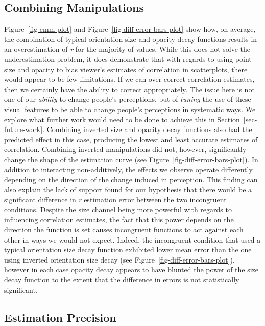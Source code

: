 \documentclass[manuscript, review, anonymous, screen]{acmart}
\begin{document}
\hypertarget{sec-combining}{%
\subsection{Combining Manipulations}\label{sec-combining}}

Figure~\ref{fig-emm-plot} and Figure~\ref{fig-diff-error-bars-plot} show
how, on average, the combination of typical orientation size and opacity
decay functions results in an overestimation of \emph{r} for the
majority of values. While this does not solve the underestimation
problem, it does demonstrate that with regards to using point size and
opacity to bias viewer's estimates of correlation in scatterplots, there
would appear to be few limitations. If we can over-correct correlation
estimates, then we certainly have the ability to correct appropriately.
The issue here is not one of our \emph{ability} to change people's
perceptions, but of \emph{tuning} the use of these visual features to be
able to change people's perceptions in systematic ways. We explore what
further work would need to be done to achieve this in
Section~\ref{sec-future-work}. Combining inverted size and opacity decay
functions also had the predicted effect in this case, producing the
lowest and least accurate estimates of correlation. Combining inverted
manipulations did not, however, significantly change the shape of the
estimation curve (see Figure~\ref{fig-diff-error-bars-plot}). In
addition to interacting non-additively, the effects we observe operate
differently depending on the direction of the change induced in
perception. This finding can also explain the lack of support found for
our hypothesis that there would be a significant difference in \emph{r}
estimation error between the two incongruent conditions. Despite the
size channel being more powerful with regards to influencing correlation
estimates, the fact that this power depends on the direction the
function is set causes incongruent functions to act against each other
in ways we would not expect. Indeed, the incongruent condition that used
a typical orientation size decay function exhibited lower mean error
than the one using inverted orientation size decay (see
Figure~\ref{fig-diff-error-bars-plot}), however in each case opacity
decay appears to have blunted the power of the size decay function to
the extent that the difference in errors is not statistically
significant.

\hypertarget{estimation-precision}{%
\subsection{Estimation Precision}\label{estimation-precision}}
\end{document}
